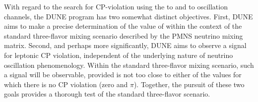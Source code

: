 With regard to the search for CP-violation
using the \numu to \nue and \anumu to \anue oscillation channels, 
the DUNE program has two somewhat distinct objectives.
First, DUNE aims to make a precise determination of the value of
\deltacp within the context of the standard three-flavor mixing
scenario described by the PMNS neutrino mixing matrix.  Second, and perhaps more significantly,
DUNE aims to observe a signal for leptonic CP violation, independent
of the underlying nature of neutrino oscillation phenomenology.
Within the standard three-flavor mixing scenario, such a signal will
be observable, provided \deltacp is not too close to either of the
values for which there is no CP violation (zero and $\pi$).  Together,
the pursuit of these two goals provides a thorough test of the
standard three-flavor scenario.

